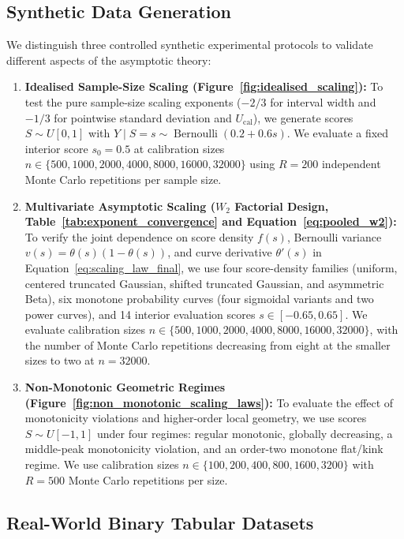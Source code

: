 \documentclass[11pt]{article}
\begin{document}
	\subsection{Synthetic Data Generation}
	We distinguish three controlled synthetic experimental protocols to validate different aspects of the asymptotic theory:
	\begin{enumerate}
		\item \textbf{Idealised Sample-Size Scaling (Figure~\ref{fig:idealised_scaling}):} To test the pure sample-size scaling exponents ($-2/3$ for interval width and $-1/3$ for pointwise standard deviation and $U_{\mathrm{cal}}$), we generate scores $S \sim U[0,1]$ with $Y\mid S=s\sim\operatorname{Bernoulli}(0.2+0.6s)$. We evaluate a fixed interior score $s_0=0.5$ at calibration sizes $n\in\{500,1000,2000,4000,8000,16000,32000\}$ using $R=200$ independent Monte Carlo repetitions per sample size.
		\item \textbf{Multivariate Asymptotic Scaling ($W_2$ Factorial Design, Table~\ref{tab:exponent_convergence} and Equation~\ref{eq:pooled_w2}):} To verify the joint dependence on score density $f(s)$, Bernoulli variance $v(s)=\theta(s)(1-\theta(s))$, and curve derivative $\theta'(s)$ in Equation~\ref{eq:scaling_law_final}, we use four score-density families (uniform, centered truncated Gaussian, shifted truncated Gaussian, and asymmetric Beta), six monotone probability curves (four sigmoidal variants and two power curves), and 14 interior evaluation scores $s\in[-0.65,0.65]$. We evaluate calibration sizes $n\in\{500,1000,2000,4000,8000,16000,32000\}$, with the number of Monte Carlo repetitions decreasing from eight at the smaller sizes to two at $n=32000$.
		\item \textbf{Non-Monotonic Geometric Regimes (Figure~\ref{fig:non_monotonic_scaling_laws}):} To evaluate the effect of monotonicity violations and higher-order local geometry, we use scores $S\sim U[-1,1]$ under four regimes: regular monotonic, globally decreasing, a middle-peak monotonicity violation, and an order-two monotone flat/kink regime. We use calibration sizes $n\in\{100,200,400,800,1600,3200\}$ with $R=500$ Monte Carlo repetitions per size.
	\end{enumerate}
	

	\subsection{Real-World Binary Tabular Datasets}
	\label{subsec:real_data_setup}
\end{document}
